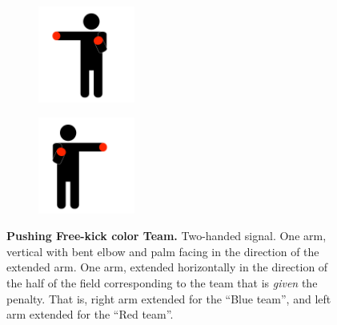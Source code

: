         \begin{figure}[ht!]
            \centering
            \begin{subfigure}{.33\textwidth}
                \includegraphics[height=120px]{figs/referee-signals/pushing.png}
            \end{subfigure}
            \begin{subfigure}{.33\textwidth}
                \includegraphics[height=120px]{figs/referee-signals/pushing-flipped.png}
            \end{subfigure}
            \caption{\textbf{Pushing Free-kick \textlangle{}color\textrangle{}  Team.}
            Two-handed signal. One arm, vertical with bent elbow and palm facing in the direction of the extended arm. One arm, extended horizontally in the direction of the half of the field corresponding to the team that is \emph{given} the penalty. That is, right arm extended for the ``Blue team'', and left arm extended for the ``Red team''.}
        \end{figure}


